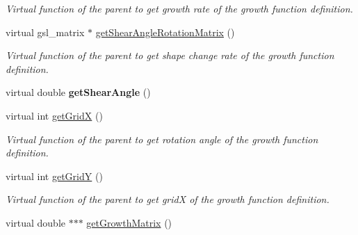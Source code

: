 \begin{DoxyCompactItemize}
\begin{DoxyCompactList}\small\item\em Virtual function of the parent to get growth rate of the growth function definition. \end{DoxyCompactList}\item 
\hypertarget{classGrowthFunctionBase_a3c0d71849d020d29832b1aaaba87065e}{}virtual gsl\+\_\+matrix $\ast$ \hyperlink{classGrowthFunctionBase_a3c0d71849d020d29832b1aaaba87065e}{get\+Shear\+Angle\+Rotation\+Matrix} ()\label{classGrowthFunctionBase_a3c0d71849d020d29832b1aaaba87065e}

\begin{DoxyCompactList}\small\item\em Virtual function of the parent to get shape change rate of the growth function definition. \end{DoxyCompactList}\item 
\hypertarget{classGrowthFunctionBase_adea116613ddb2edb7ebc0734d17c9226}{}virtual double {\bfseries get\+Shear\+Angle} ()\label{classGrowthFunctionBase_adea116613ddb2edb7ebc0734d17c9226}

\item 
\hypertarget{classGrowthFunctionBase_a1dfd024db9bf627777741c68f7b5ddf2}{}virtual int \hyperlink{classGrowthFunctionBase_a1dfd024db9bf627777741c68f7b5ddf2}{get\+Grid\+X} ()\label{classGrowthFunctionBase_a1dfd024db9bf627777741c68f7b5ddf2}

\begin{DoxyCompactList}\small\item\em Virtual function of the parent to get rotation angle of the growth function definition. \end{DoxyCompactList}\item 
\hypertarget{classGrowthFunctionBase_a1445bfc812abb72fd6757859aa302feb}{}virtual int \hyperlink{classGrowthFunctionBase_a1445bfc812abb72fd6757859aa302feb}{get\+Grid\+Y} ()\label{classGrowthFunctionBase_a1445bfc812abb72fd6757859aa302feb}

\begin{DoxyCompactList}\small\item\em Virtual function of the parent to get grid\+X of the growth function definition. \end{DoxyCompactList}\item 
\hypertarget{classGrowthFunctionBase_a067bdcd836e7196ce5cfc9120b9499c1}{}virtual double $\ast$$\ast$$\ast$ \hyperlink{classGrowthFunctionBase_a067bdcd836e7196ce5cfc9120b9499c1}{get\+Growth\+Matrix} ()\label{classGrowthFunctionBase_a067bdcd836e7196ce5cfc9120b9499c1}


\end{DoxyCompactItemize}
